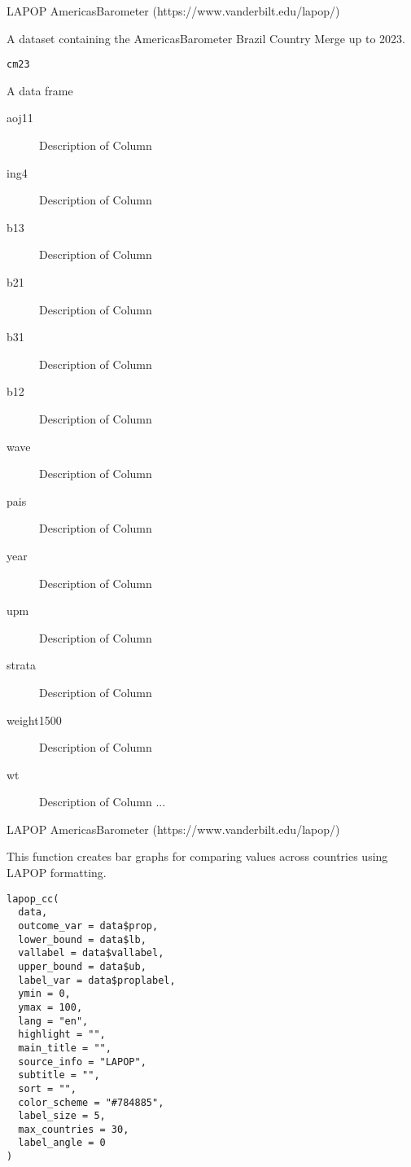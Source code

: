 \documentclass[a4paper]{book}
\begin{document}
%
\begin{Source}
LAPOP AmericasBarometer (https://www.vanderbilt.edu/lapop/)
\end{Source}
%
\begin{Description}
A dataset containing the AmericasBarometer Brazil Country Merge up to 2023.
\end{Description}
%
\begin{Usage}
\begin{verbatim}
cm23
\end{verbatim}
\end{Usage}
%
\begin{Format}
A data frame
\begin{description}

\item[aoj11] Description of Column
\item[ing4] Description of Column
\item[b13] Description of Column
\item[b21] Description of Column
\item[b31] Description of Column
\item[b12] Description of Column
\item[wave] Description of Column
\item[pais] Description of Column
\item[year] Description of Column
\item[upm] Description of Column
\item[strata] Description of Column
\item[weight1500] Description of Column
\item[wt] Description of Column
...

\end{description}

\end{Format}
%
\begin{Source}
LAPOP AmericasBarometer (https://www.vanderbilt.edu/lapop/)
\end{Source}
%
\begin{Description}
This function creates bar graphs for comparing values across countries using LAPOP formatting.
\end{Description}
%
\begin{Usage}
\begin{verbatim}
lapop_cc(
  data,
  outcome_var = data$prop,
  lower_bound = data$lb,
  vallabel = data$vallabel,
  upper_bound = data$ub,
  label_var = data$proplabel,
  ymin = 0,
  ymax = 100,
  lang = "en",
  highlight = "",
  main_title = "",
  source_info = "LAPOP",
  subtitle = "",
  sort = "",
  color_scheme = "#784885",
  label_size = 5,
  max_countries = 30,
  label_angle = 0
)
\end{verbatim}
\end{Usage}
\end{document}
